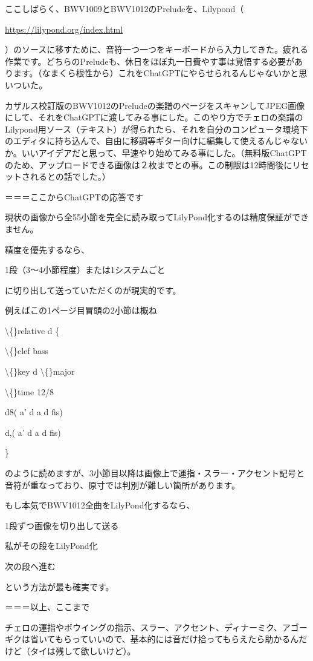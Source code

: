 \documentclass[facebook_diary.tex]{subfiles}
\begin{document}
ここしばらく、BWV1009とBWV1012のPreludeを、Lilypond（ 

\url{https://lilypond.org/index.html}

 ）のソースに移すために、音符一つ一つをキーボードから入力してきた。疲れる作業です。どちらのPreludeも、休日をほぼ丸一日費やす事は覚悟する必要があります。（なまくら根性から）これをChatGPTにやらせられるんじゃないかと思いついた。


カザルス校訂版のBWV1012のPreludeの楽譜のページをスキャンしてJPEG画像にして、それをChatGPTに渡してみる事にした。このやり方でチェロの楽譜のLilypond用ソース（テキスト）が得られたら、それを自分のコンピュータ環境下のエディタに持ち込んで、自由に移調等ギター向けに編集して使えるんじゃないか。いいアイデアだと思って、早速やり始めてみる事にした。（無料版ChatGPTのため、アップロードできる画像は２枚までとの事。この制限は12時間後にリセットされるとの話でした。）


＝＝＝ここからChatGPTの応答です

現状の画像から全55小節を完全に読み取ってLilyPond化するのは精度保証ができません。


精度を優先するなら、

1段（3〜4小節程度）または1システムごと

に切り出して送っていただくのが現実的です。


例えばこの1ページ目冒頭の2小節は概ね


\textbackslash\{\}relative d \{

\textbackslash\{\}clef bass

\textbackslash\{\}key d \textbackslash\{\}major

\textbackslash\{\}time 12/8


d8( a' d a d fis)

d,( a' d a d fis)

\}


のように読めますが、3小節目以降は画像上で運指・スラー・アクセント記号と音符が重なっており、原寸では判別が難しい箇所があります。


もし本気でBWV1012全曲をLilyPond化するなら、


1段ずつ画像を切り出して送る

私がその段をLilyPond化

次の段へ進む


という方法が最も確実です。

＝＝＝以上、ここまで

チェロの運指やボウイングの指示、スラー、アクセント、ディナーミク、アゴーギクは省いてもらっていいので、基本的には音だけ拾ってもらえたら助かるんだけど（タイは残して欲しいけど）。
\end{document}
